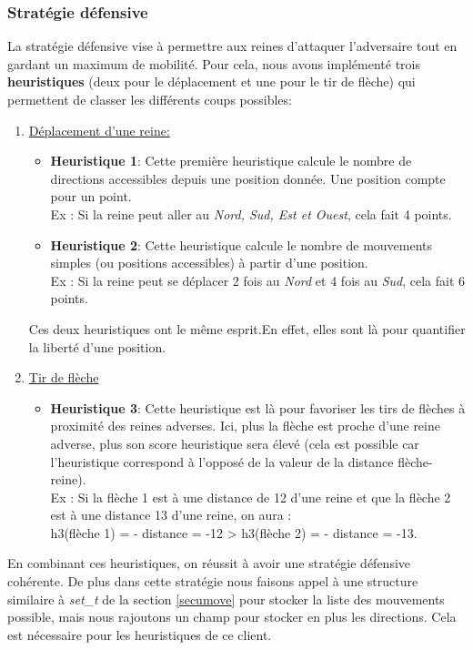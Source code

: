 \documentclass{article}
\begin{document}
\subsubsection{Stratégie défensive}
La stratégie défensive vise à permettre aux reines d'attaquer l'adversaire tout en gardant un maximum de mobilité. Pour cela, nous avons implémenté trois \textbf{heuristiques} (deux pour le déplacement et une pour le tir de flèche) qui permettent de classer les différents coups possibles:
\begin{enumerate}
\item \underline{Déplacement d'une reine:}
\begin{itemize}
\item \textbf{Heuristique 1}: Cette première heuristique calcule le nombre de directions accessibles depuis une position donnée. Une position compte pour un point. 
\\Ex : Si la reine peut aller au \textit{Nord, Sud, Est et Ouest}, cela fait 4 points.
\item \textbf{Heuristique 2}: Cette heuristique calcule le nombre de mouvements simples (ou positions accessibles) à partir d'une position. \\Ex : Si la reine peut se déplacer 2 fois au \textit{Nord} et 4 fois au \textit{Sud}, cela fait 6 points.
\end{itemize}
\vspace{0.2cm}
Ces deux heuristiques ont le même esprit.En effet, elles sont là pour quantifier la liberté d'une position.
\item \underline{Tir de flèche}
\begin{itemize}
\item \textbf{Heuristique 3}: Cette heuristique est là pour favoriser les tirs de flèches à proximité des reines adverses. Ici, plus la flèche est proche d'une reine adverse, plus son score heuristique sera élevé (cela est possible car l'heuristique correspond à l'opposé de la valeur de la distance flèche-reine).
\\Ex : Si la flèche 1 est à une distance de 12 d'une reine et que la flèche 2 est à une distance 13 d'une reine, on aura :
\\h3(flèche 1) = - distance = -12  >  h3(flèche 2) = - distance = -13.
\end{itemize}
\end{enumerate}
En combinant ces heuristiques, on réussit à avoir une stratégie défensive cohérente. De plus dans cette stratégie nous faisons appel à une structure similaire à \textit{set\_t} de la section \ref{secumove} pour stocker la liste des mouvements possible, mais nous rajoutons un champ pour stocker en plus les directions. Cela est nécessaire pour les heuristiques de ce client.
\end{document}
